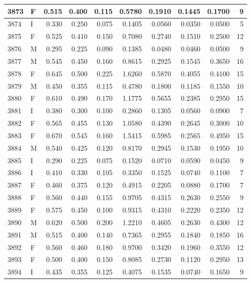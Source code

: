 \documentclass[9pt,twocolumn,twoside,]{pnas-new}
\begin{document}
\begin{tabular}{l|l|r|r|r|r|r|r|r|r}
\hline
3873 & F & 0.515 & 0.400 & 0.115 & 0.5780 & 0.1910 & 0.1445 & 0.1700 & 9\\
\hline
3874 & I & 0.330 & 0.250 & 0.075 & 0.1405 & 0.0560 & 0.0350 & 0.0500 & 5\\
\hline
3875 & F & 0.525 & 0.410 & 0.150 & 0.7080 & 0.2740 & 0.1510 & 0.2500 & 12\\
\hline
3876 & M & 0.295 & 0.225 & 0.090 & 0.1385 & 0.0480 & 0.0460 & 0.0500 & 9\\
\hline
3877 & M & 0.545 & 0.450 & 0.160 & 0.8615 & 0.2925 & 0.1545 & 0.3650 & 16\\
\hline
3878 & F & 0.645 & 0.500 & 0.225 & 1.6260 & 0.5870 & 0.4055 & 0.4100 & 15\\
\hline
3879 & M & 0.450 & 0.355 & 0.115 & 0.4780 & 0.1800 & 0.1185 & 0.1550 & 10\\
\hline
3880 & F & 0.610 & 0.490 & 0.170 & 1.1775 & 0.5655 & 0.2385 & 0.2950 & 15\\
\hline
3881 & I & 0.380 & 0.300 & 0.100 & 0.2860 & 0.1305 & 0.0560 & 0.0900 & 7\\
\hline
3882 & F & 0.565 & 0.455 & 0.130 & 1.0580 & 0.4390 & 0.2645 & 0.3000 & 10\\
\hline
3883 & F & 0.670 & 0.545 & 0.160 & 1.5415 & 0.5985 & 0.2565 & 0.4950 & 15\\
\hline
3884 & M & 0.540 & 0.425 & 0.120 & 0.8170 & 0.2945 & 0.1530 & 0.1950 & 10\\
\hline
3885 & I & 0.290 & 0.225 & 0.075 & 0.1520 & 0.0710 & 0.0590 & 0.0450 & 9\\
\hline
3886 & I & 0.410 & 0.330 & 0.105 & 0.3350 & 0.1525 & 0.0740 & 0.1100 & 7\\
\hline
3887 & F & 0.460 & 0.375 & 0.120 & 0.4915 & 0.2205 & 0.0880 & 0.1700 & 7\\
\hline
3888 & F & 0.560 & 0.440 & 0.155 & 0.9705 & 0.4315 & 0.2630 & 0.2550 & 9\\
\hline
3889 & F & 0.575 & 0.450 & 0.100 & 0.9315 & 0.4310 & 0.2220 & 0.2350 & 12\\
\hline
3890 & M & 0.620 & 0.500 & 0.200 & 1.2210 & 0.4605 & 0.2630 & 0.4300 & 12\\
\hline
3891 & M & 0.515 & 0.400 & 0.140 & 0.7365 & 0.2955 & 0.1840 & 0.1850 & 16\\
\hline
3892 & F & 0.560 & 0.460 & 0.180 & 0.9700 & 0.3420 & 0.1960 & 0.3550 & 12\\
\hline
3893 & F & 0.500 & 0.400 & 0.150 & 0.8085 & 0.2730 & 0.1120 & 0.2950 & 13\\
\hline
3894 & I & 0.435 & 0.355 & 0.125 & 0.4075 & 0.1535 & 0.0740 & 0.1650 & 9\\

\end{tabular}
\end{document}
